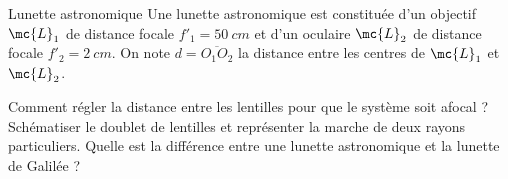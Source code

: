 \begin{exo}[PCSI][2]{Lunette astronomique}
Une lunette astronomique est constituée d'un objectif $\mc{L}_{1}$  de distance focale $f'_{1}=\SI{50}{cm}$ et d'un oculaire $\mc{L}_{2}$ de distance focale $f'_{2}=\SI{2}{cm}$. On note $d=\overline{O_1O_2}$ la distance entre les centres de $\mc{L}_1$ et $\mc{L}_2$.

\begin{quest}
 \item Comment régler la distance entre les lentilles pour que le système soit afocal ? Schématiser le doublet de lentilles et représenter la marche de deux rayons particuliers. Quelle est la différence entre  une lunette astronomique et la lunette de Galilée ?
\end{quest}
\end{exo}
